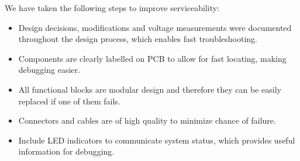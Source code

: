 We have taken the following steps to improve serviceability:
\begin{itemize}
    \item Design decisions, modifications and voltage measurements were documented throughout the design process, which enables fast troubleshooting.
    \item  Components are clearly labelled on PCB to allow for fast locating, making debugging easier.
    \item All functional blocks are modular design and therefore they can be easily replaced if one of them fails.
    \item Connectors and cables are of high quality to minimize chance of failure.
    \item Include LED indicators to communicate system status, which provides useful information for debugging.
\end{itemize}
 